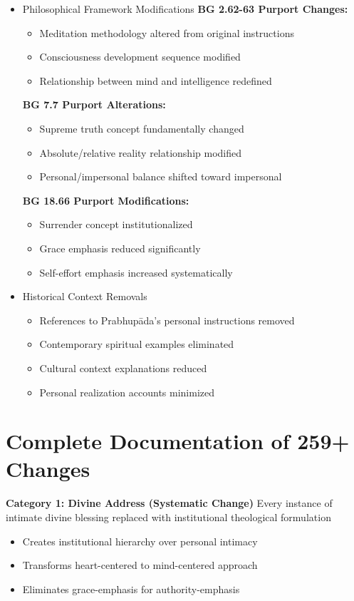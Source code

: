\documentclass[11pt,twoside]{book}
\begin{document}
\begin{itemize}
\item Philosophical Framework Modifications
\label{sec:org3cd7393}
\textbf{\textbf{BG 2.62-63 Purport Changes:}}
\begin{itemize}
\item Meditation methodology altered from original instructions
\item Consciousness development sequence modified
\item Relationship between mind and intelligence redefined
\end{itemize}

\textbf{\textbf{BG 7.7 Purport Alterations:}}
\begin{itemize}
\item Supreme truth concept fundamentally changed
\item Absolute/relative reality relationship modified
\item Personal/impersonal balance shifted toward impersonal
\end{itemize}

\textbf{\textbf{BG 18.66 Purport Modifications:}}
\begin{itemize}
\item Surrender concept institutionalized
\item Grace emphasis reduced significantly
\item Self-effort emphasis increased systematically
\end{itemize}
\item Historical Context Removals
\label{sec:orgbafdc85}
\begin{itemize}
\item References to Prabhupāda's personal instructions removed
\item Contemporary spiritual examples eliminated
\item Cultural context explanations reduced
\item Personal realization accounts minimized
\end{itemize}
\end{itemize}
\section*{Complete Documentation of 259+ Changes}
\label{sec:org4d895cb}

\textbf{\textbf{Category 1: Divine Address (Systematic Change)}}
Every instance of intimate divine blessing replaced with institutional theological formulation
\begin{itemize}
\item Creates institutional hierarchy over personal intimacy
\item Transforms heart-centered to mind-centered approach
\item Eliminates grace-emphasis for authority-emphasis
\end{itemize}
\end{document}
